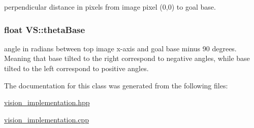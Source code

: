 perpendicular distance in pixels from image pixel (0,0) to goal base. 

\hypertarget{classVS_ae5681e223d5b1fec1e8cf7b8ebe29577}{
\subsubsection[{theta\-Base}]{\setlength{\rightskip}{0pt plus 5cm}float V\-S\-::theta\-Base\hspace{0.3cm}{\ttfamily [private]}}}\label{classVS_ae5681e223d5b1fec1e8cf7b8ebe29577}


angle in radians between top image x-\/axis and goal base minus 90 degrees. Meaning that base tilted to the right correspond to negative angles, while base tilted to the left correspond to positive angles. 



The documentation for this class was generated from the following files\-:\begin{DoxyCompactItemize}
\item 
\hyperlink{vision__implementation_8hpp}{vision\-\_\-implementation.\-hpp}\item 
\hyperlink{vision__implementation_8cpp}{vision\-\_\-implementation.\-cpp}\end{DoxyCompactItemize}

